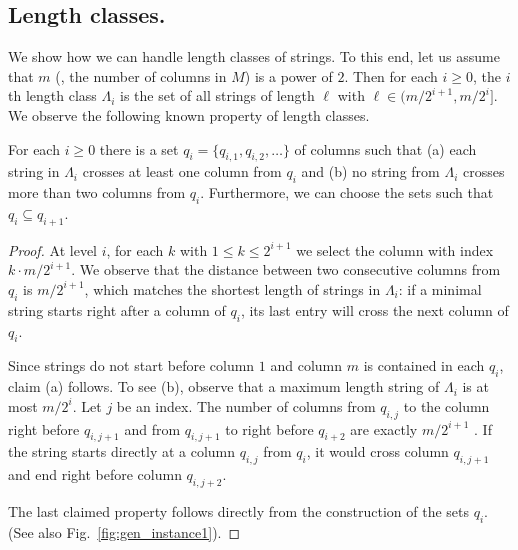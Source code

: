 \subsection{Length classes.}\label{sec:length-classes}
We show how we can handle length classes of strings.
To this end, let us assume \WLOG that $m$ (\ie, the number of columns in $M$) is a power of $2$.
Then for each $i \ge 0$, the $i$th length class $\Lambda_i$ is the set of all strings of length $\ell$ with $\ell \in (m/2^{i+1}, m/2^{i}]$. 
We observe the following known property of length classes.
\begin{lemma}\label{lem:half}
    For each $i \ge 0$ there is a set $q_i = \{q_{i,1},q_{i,2},\dotsc\}$ of columns such that (a) each string in $\Lambda_i$ crosses at least one column from $q_i$ and (b) no string from $\Lambda_i$ crosses more than two columns from $q_i$.
    Furthermore, we can choose the sets such that $q_i \subseteq q_{i+1}$.
\end{lemma}
\begin{proof}
    At level $i$, for each $k$ with $1 \le k \le 2^{i+1}$ we select the column with index $k \cdot m/2^{i+1}$.
    We observe that the distance between two consecutive columns from $q_i$ is $m/2^{i+1}$, which matches the shortest length of strings in $\Lambda_i$: 
    if a minimal string starts right after a column of $q_i$, its last entry will cross the next column of $q_i$. 

    Since strings do not start before column $1$ and column $m$ is contained in each $q_i$, claim (a) follows.
    To see (b), observe that a maximum length string of $\Lambda_i$ is at most $m/2^i$.
    Let $j$ be an index. 
    The number of columns from $q_{i,j}$ to the column right before $q_{i,j+1}$ and from $q_{i,j+1}$ to right before $q_{i+2}$ are exactly $m/2^{i+1}$ .
    If the string starts directly at a column $q_{i,j}$ from $q_i$, it would cross column $q_{i,j+1}$ and end right before column $q_{i,j+2}$.
    
    The last claimed property follows directly from the construction of the sets $q_i$. 
    (See also Fig.~\ref{fig:gen_instance1}).
\end{proof}

